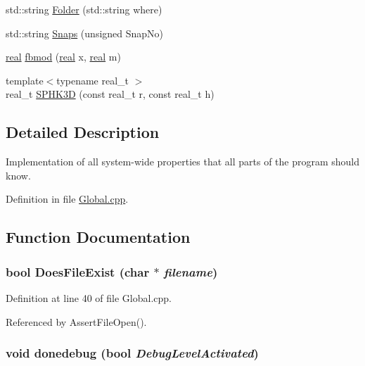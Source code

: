 \begin{DoxyCompactItemize}
\item 
std::string \hyperlink{Global_8cpp_ad3867aaa410297f271cb4a5f443f368c}{Folder} (std::string where)
\item 
std::string \hyperlink{Global_8cpp_ab95a6a07eed667f94b0951a15f1a9b0e}{Snaps} (unsigned SnapNo)
\item 
\hyperlink{Global_8h_a031f8951175b43076c2084a6c2173410}{real} \hyperlink{Global_8cpp_a899f0547561b988f5ed4f2ad3e834cbf}{fbmod} (\hyperlink{Global_8h_a031f8951175b43076c2084a6c2173410}{real} x, \hyperlink{Global_8h_a031f8951175b43076c2084a6c2173410}{real} m)
\item 
{\footnotesize template$<$typename real\_\-t $>$ }\\real\_\-t \hyperlink{Global_8cpp_a0cb8e9ba7bd0b1861c15a42aa799dcd4}{SPHK3D} (const real\_\-t r, const real\_\-t h)
\end{DoxyCompactItemize}


\subsection{Detailed Description}
Implementation of all system-\/wide properties that all parts of the program should know. 

Definition in file \hyperlink{Global_8cpp_source}{Global.cpp}.



\subsection{Function Documentation}
\subsubsection[{DoesFileExist}]{\setlength{\rightskip}{0pt plus 5cm}bool DoesFileExist (char $\ast$ {\em filename})}\label{Global_8cpp_a1c4c7d9ff8a31be4d5076c817d1297e3}


Definition at line 40 of file Global.cpp.



Referenced by AssertFileOpen().

\subsubsection[{donedebug}]{\setlength{\rightskip}{0pt plus 5cm}void donedebug (bool {\em DebugLevelActivated})}\label{Global_8cpp_a537260c4c4c2057809ee9ca92cf460c7}


